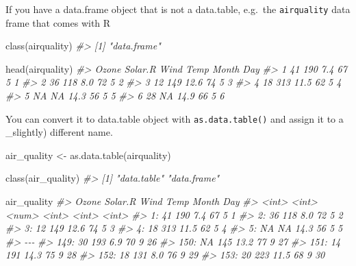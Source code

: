 \documentclass[
]{book}
\newenvironment{Shaded}{\begin{snugshade}}{\end{snugshade}}
\newcommand{\CommentTok}[1]{\textcolor[rgb]{0.56,0.35,0.01}{\textit{#1}}}
\newcommand{\FunctionTok}[1]{\textcolor[rgb]{0.00,0.00,0.00}{#1}}
\newcommand{\NormalTok}[1]{#1}
\newcommand{\OtherTok}[1]{\textcolor[rgb]{0.56,0.35,0.01}{#1}}
\begin{document}
If you have a data.frame object that is not a data.table, e.g.~the \texttt{airquality} data frame that comes with R

\begin{Shaded}
\begin{Highlighting}[]
\FunctionTok{class}\NormalTok{(airquality)}
\CommentTok{\#\textgreater{} [1] "data.frame"}

\FunctionTok{head}\NormalTok{(airquality)}
\CommentTok{\#\textgreater{}   Ozone Solar.R Wind Temp Month Day}
\CommentTok{\#\textgreater{} 1    41     190  7.4   67     5   1}
\CommentTok{\#\textgreater{} 2    36     118  8.0   72     5   2}
\CommentTok{\#\textgreater{} 3    12     149 12.6   74     5   3}
\CommentTok{\#\textgreater{} 4    18     313 11.5   62     5   4}
\CommentTok{\#\textgreater{} 5    NA      NA 14.3   56     5   5}
\CommentTok{\#\textgreater{} 6    28      NA 14.9   66     5   6}
\end{Highlighting}
\end{Shaded}

You can convert it to data.table object with \texttt{as.data.table()} and assign it to a \_slightly) different name.

\begin{Shaded}
\begin{Highlighting}[]
\NormalTok{air\_quality }\OtherTok{\textless{}{-}} \FunctionTok{as.data.table}\NormalTok{(airquality)}

\FunctionTok{class}\NormalTok{(air\_quality)}
\CommentTok{\#\textgreater{} [1] "data.table" "data.frame"}

\NormalTok{air\_quality}
\CommentTok{\#\textgreater{}      Ozone Solar.R  Wind  Temp Month   Day}
\CommentTok{\#\textgreater{}      \textless{}int\textgreater{}   \textless{}int\textgreater{} \textless{}num\textgreater{} \textless{}int\textgreater{} \textless{}int\textgreater{} \textless{}int\textgreater{}}
\CommentTok{\#\textgreater{}   1:    41     190   7.4    67     5     1}
\CommentTok{\#\textgreater{}   2:    36     118   8.0    72     5     2}
\CommentTok{\#\textgreater{}   3:    12     149  12.6    74     5     3}
\CommentTok{\#\textgreater{}   4:    18     313  11.5    62     5     4}
\CommentTok{\#\textgreater{}   5:    NA      NA  14.3    56     5     5}
\CommentTok{\#\textgreater{}  {-}{-}{-}                                      }
\CommentTok{\#\textgreater{} 149:    30     193   6.9    70     9    26}
\CommentTok{\#\textgreater{} 150:    NA     145  13.2    77     9    27}
\CommentTok{\#\textgreater{} 151:    14     191  14.3    75     9    28}
\CommentTok{\#\textgreater{} 152:    18     131   8.0    76     9    29}
\CommentTok{\#\textgreater{} 153:    20     223  11.5    68     9    30}
\end{Highlighting}
\end{Shaded}
\end{document}
